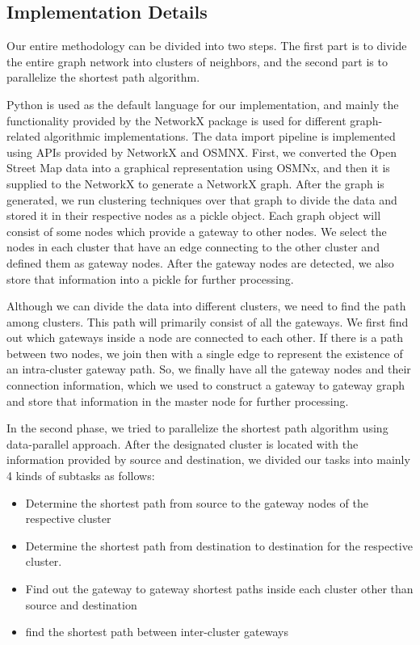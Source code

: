 \subsection{Implementation Details}
Our entire methodology can be divided into two steps. The first part is to divide the entire graph network into clusters of neighbors, and the second part is to parallelize the shortest path algorithm.

Python is used as the default language for our implementation, and mainly the functionality provided by the NetworkX package is used for different graph-related algorithmic implementations. The data import pipeline is implemented using APIs provided by NetworkX and OSMNX. First, we converted the Open Street Map data into a graphical representation using OSMNx, and then it is supplied to the NetworkX to generate a NetworkX graph. After the graph is generated, we run clustering techniques over that graph to divide the data and stored it in their respective nodes as a pickle object. Each graph object will consist of some nodes which provide a gateway to other nodes. We select the nodes in each cluster that have an edge connecting to the other cluster and defined them as gateway nodes. After the gateway nodes are detected, we also store that information into a pickle for further processing.

Although we can divide the data into different clusters, we need to find the path among clusters. This path will primarily consist of all the gateways. We first find out which gateways inside a node are connected to each other. If there is a path between two nodes, we join then with a single edge to represent the existence of an intra-cluster gateway path. So, we finally have all the gateway nodes and their connection information, which we used to construct a gateway to gateway graph and store that information in the master node for further processing.

In the second phase, we tried to parallelize the shortest path algorithm using data-parallel approach. After the designated cluster is located with the information provided by source and destination, we divided our tasks into mainly 4 kinds of subtasks as follows:

\begin{itemize}
	\item Determine the shortest path from source to the gateway nodes of the respective cluster
	\item Determine the shortest path from destination to destination for the respective cluster.
	\item Find out the gateway to gateway shortest paths inside each cluster other than source and destination
	\item find the shortest path between inter-cluster gateways
\end{itemize}


